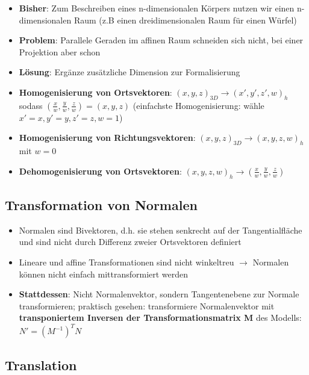 \documentclass[10pt,a4paper]{article}
\begin{document}
	\begin{itemize}
		\item \textbf{Bisher}: Zum Beschreiben eines n-dimensionalen Körpers nutzen wir einen n-dimensionalen Raum (z.B einen dreidimensionalen Raum für einen Würfel)
		\item \textbf{Problem}: Parallele Geraden im affinen Raum schneiden sich nicht, bei einer Projektion aber schon
		\item \textbf{Lösung}: Ergänze zusätzliche Dimension zur Formalisierung
		\item \textbf{Homogenisierung von Ortsvektoren}: $(x, y, z)_{3D} \rightarrow (x', y', z', w)_h$ sodass $(\frac{x}{w}, \frac{y}{w}, \frac{z}{w}) = (x, y, z)$ (einfachste Homogenisierung: wähle $x' = x, y' = y, z' = z, w = 1$)
		\item \textbf{Homogenisierung von Richtungsvektoren}: $(x, y, z)_{3D} \rightarrow (x, y, z, w)_h$ mit $w = 0$
		\item \textbf{Dehomogenisierung von Ortsvektoren}: $(x, y, z, w)_h \rightarrow (\frac{x}{w}, \frac{y}{w}, \frac{z}{w})$
	\end{itemize}

	\subsection{Transformation von Normalen}
	\label{sub:transformation_von_normalen}

	\begin{itemize}
		\item Normalen sind Bivektoren, d.h. sie stehen senkrecht auf der Tangentialfläche und sind nicht durch Differenz zweier Ortsvektoren definiert
		\item Lineare und affine Transformationen sind nicht winkeltreu $\rightarrow$ Normalen können nicht einfach mittransformiert werden
		\item \textbf{Stattdessen}: Nicht Normalenvektor, sondern Tangentenebene zur Normale transformieren; praktisch gesehen: transformiere Normalenvektor mit \textbf{transponiertem Inversen der Transformationsmatrix M} des Modells: $N' = (M^{-1})^T N$
	\end{itemize}

	\newpage
	\subsection{Translation}
	\label{sub:translation}
	
\end{document}
